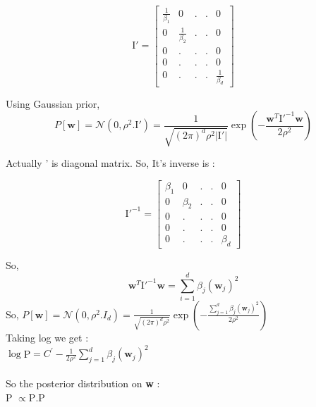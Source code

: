 \documentclass[a4paper,11pt]{article}
\begin{document}
\begin{mlsolution}
\[ \text{I}{}' = \begin{bmatrix}
\frac{1}{\beta_{1}} & 0 & . & . & 0\\ 
0 & \frac{1}{\beta_{2}} & . & . & 0 \\ 
0 & . & . & . & 0\\ 
0 & . & . & . & 0\\ 
0 & . & . & . & \frac{1}{\beta_{d}}
\end{bmatrix}\]

Using Gaussian prior, 
\[
P[\textbf{w}] = \mathcal{N}\left ( 0, \rho^{2}.\text{I}{}' \right ) = \frac{1}{\sqrt{\left ( 2\pi \right)^{d}\rho^{2}\left | \text{I}{}' \right |}}\exp\left ( - \frac{\textbf{w}^T\text{I}{}'^{-1}\textbf{w}}{2\rho^{2}} \right )
\]

Actually ' is diagonal matrix. So, It's inverse is :

\[
    \text{I}{}'^{-1} = \begin{bmatrix}
\beta_{1} & 0 & . & . & 0\\ 
0 & \beta_{2} & . & . & 0 \\ 
0 & . & . & . & 0\\ 
0 & . & . & . & 0\\ 
0 & . & . & . & \beta_{d}
\end{bmatrix}
\]

So, 
\[
\textbf{w}^T\text{I}{}'^{-1}\textbf{w} = \sum_{i=1}^{d}   \beta_j \left ( \textbf{w}_{j} \right )^{2}
\]
So, 
\begin{math}
P[\textbf{w}] = \mathcal{N}\left ( 0, \rho^{2}.I_{d} \right ) = \frac{1}{\sqrt{\left ( 2\pi \right)^{d}\rho^{2}}}\exp\left ( - \frac{\sum_{j = 1}^{d} \beta_{j}\left ( \textbf{w}_{j} \right )^{2} }{2\rho^{2}} \right )
\end{math}
\\Taking log we get :\\

\begin{math}
\log \end{math}\;P\begin{math}[\textbf{w}]  = C^{'} - \frac{1}{2\rho^{2}} \sum_{j = 1}^{d} \beta_{j}\left ( \textbf{w}_{j} \right )^{2} 
\end{math}\\\\So the posterior distribution on \textbf{w} :\\

P \begin{math}[\textbf{w}\mid\textbf{X},\textbf{y}]  \propto \end{math}\;P\begin{math}[\textbf{y}|\textbf{X}, \textbf{w}] . \end{math}\;P\begin{math}[\textbf{w}]\end{math}\\


\end{mlsolution}
\end{document}
